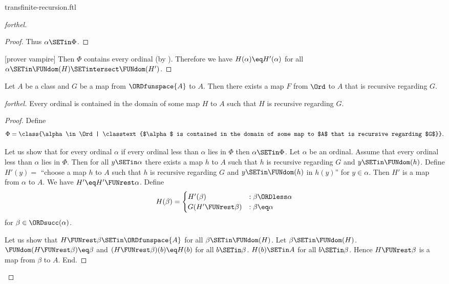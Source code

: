 \documentclass{article}
\begin{document}
\begin{smodule}{transfinite-recursion.ftl}
\begin{proof}[forthel]
\begin{proof}
    Thus $\alpha \SETin \Phi$.
  \end{proof}

  [prover vampire]
  Then $\Phi$ contains every ordinal (by ).
  Therefore we have $H(\alpha) \eq H'(\alpha)$ for all $\alpha \SETin \FUNdom(H) \SETintersect \FUNdom(H')$.
\end{proof}

\begin{theorem}[forthel,title=Transfinite Recursion Theorem: Existence,id=transfinite_recursion_existence]
  Let $A$ be a class and $G$ be a map from $\ORDfunspace{A}$ to $A$.
  Then there exists a map $F$ from $\Ord$ to $A$ that is recursive regarding $G$.
\end{theorem}
\begin{proof}[forthel]
  Every ordinal is contained in the domain of some map $H$ to $A$ such that $H$ is recursive regarding $G$.
  \begin{proof}
    Define \[ \Phi = \class{\alpha \in \Ord | \classtext{$\alpha$ is contained in the domain of some map to $A$ that is recursive regarding $G$}}. \]

    Let us show that for every ordinal $\alpha$ if every ordinal less than $\alpha$ lies in $\Phi$ then $\alpha \SETin \Phi$.
      Let $\alpha$ be an ordinal.
      Assume that every ordinal less than $\alpha$ lies in $\Phi$.
      Then for all $y \SETin \alpha$ there exists a map $h$ to $A$ such that $h$ is recursive regarding $G$ and $y \SETin \FUNdom(h)$.
      Define $H'(y) =$ ``choose a map $h$ to $A$ such that $h$ is recursive regarding $G$ and $y \SETin \FUNdom(h)$ in $h(y)$'' for $y \in \alpha$.
      Then $H'$ is a map from $\alpha$ to $A$.
      We have $H' \eq H' \FUNrest \alpha$.
      Define \[ H(\beta) =
        \begin{cases}
          H'(\beta)                 & : \beta \ORDless \alpha \\
          G(H' \FUNrest \beta)  & : \beta \eq \alpha
        \end{cases} \]
      for $\beta \in \ORDsucc(\alpha)$.
      
      Let us show that $H \FUNrest \beta \SETin \ORDfunspace{A}$ for all $\beta \SETin \FUNdom(H)$.
        Let $\beta \SETin \FUNdom(H)$.
        $\FUNdom(H \FUNrest \beta) \eq \beta$ and $(H \FUNrest \beta)(b) \eq H(b)$ for all $b \SETin \beta$.
        $H(b) \SETin A$ for all $b \SETin \beta$.
        Hence $H \FUNrest \beta$ is a map from $\beta$ to $A$.
      End.


\end{proof}
\end{proof}
\end{smodule}
\end{document}
